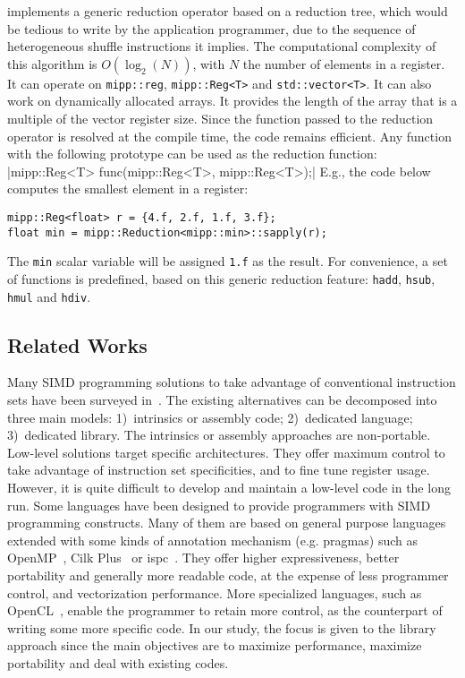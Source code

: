 \MIPP implements a generic reduction operator based on a reduction tree, which
would be tedious to write by the application programmer, due to the sequence of
heterogeneous shuffle instructions it implies. The computational complexity of
this algorithm is $O(\log_2(N))$, with $N$ the number of elements in a register.
It can operate on \verb|mipp::reg|, \verb|mipp::Reg<T>| and
\verb|std::vector<T>|. It can also work on dynamically allocated arrays. It
provides the length of the array that is a multiple of the vector register size.
Since the function passed to the reduction operator is resolved at the compile
time, the code remains efficient. Any function with the following prototype can
be used as the reduction function:
|mipp::Reg<T> func(mipp::Reg<T>, mipp::Reg<T>);|
{\noindent
E.g., the code below computes the smallest element in a register:
}
\begin{verbatim}
mipp::Reg<float> r = {4.f, 2.f, 1.f, 3.f};
float min = mipp::Reduction<mipp::min>::sapply(r);
\end{verbatim}
The \verb|min| scalar variable will be assigned \verb|1.f| as the result. For
convenience, a set of functions is predefined, based on this generic reduction
feature: \verb|hadd|, \verb|hsub|, \verb|hmul| and \verb|hdiv|.

\subsection{Related Works}

Many SIMD programming solutions to take advantage of conventional instruction
sets have been surveyed in~\cite{Pohl2016}. The existing alternatives can be
decomposed into three main models: 1)~intrinsics or assembly code; 2)~dedicated
language; 3)~dedicated library. The intrinsics or assembly approaches are
non-portable. Low-level solutions target specific architectures. They offer
maximum control to take advantage of instruction set specificities, and to fine
tune register usage. However, it is quite difficult to develop and maintain a
low-level code in the long run. Some languages have been designed to provide
programmers with SIMD programming constructs. Many of them are based on general
purpose languages extended with some kinds of annotation mechanism (e.g.
pragmas) such as OpenMP~\cite{OpenMP2013}, Cilk Plus~\cite{Robison2013} or
ispc~\cite{Pharr2012}. They offer higher expressiveness, better portability and
generally more readable code, at the expense of less programmer control, and
vectorization performance. More specialized languages, such as
OpenCL~\cite{Howes2015}, enable the programmer to retain more control, as the
counterpart of writing some more specific code. In our study, the focus is given
to the library approach since the main objectives are to maximize performance,
maximize portability and deal with existing \Cxx codes.

